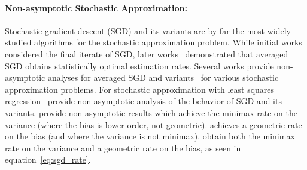 \label{sec:related}
\paragraph{Non-asymptotic Stochastic Approximation:} Stochastic gradient descent (SGD) and its variants are by far the most
widely studied algorithms for the stochastic approximation problem.
While initial works~\citep{RobbinsM51} considered the final iterate of
SGD, later works~\citep{Ruppert88,PolyakJ92} demonstrated that averaged
SGD obtains statistically optimal estimation rates. Several 
works provide non-asymptotic analyses for averaged
SGD and variants~\citep{BachM11,Bach14,FrostigGKS15} for various
stochastic approximation problems. For stochastic approximation with
least squares regression~\citet{BachM13,DefossezB15,NeedellSW16,FrostigGKS15,JainKKNS16}
provide non-asymptotic analysis of the behavior of SGD and its
variants. \cite{DefossezB15,DieuleveutB15} provide non-asymptotic results which achieve the minimax rate on the variance (where the bias is lower order, not geometric).
\cite{NeedellSW16} achieves a geometric rate on the bias (and where the variance is not minimax). \cite{FrostigGKS15,JainKKNS16} obtain both the minimax rate on the variance and a geometric rate on the bias, as seen in equation~\ref{eq:sgd_rate}. 

\iffalse
 The works in \cite{BachM13,DefossezB15} achieve the minimax
rate on the variance, while \cite{NeedellSW16} achieves a geometric
rate of decay on the bias; \cite{FrostigGKS15,JainKKNS16} obtain both
the minimax rate on the variance and a geometric rate of decay on the
bias, as seen in equation~\ref{eq:sgd_rate}. 
\fi

